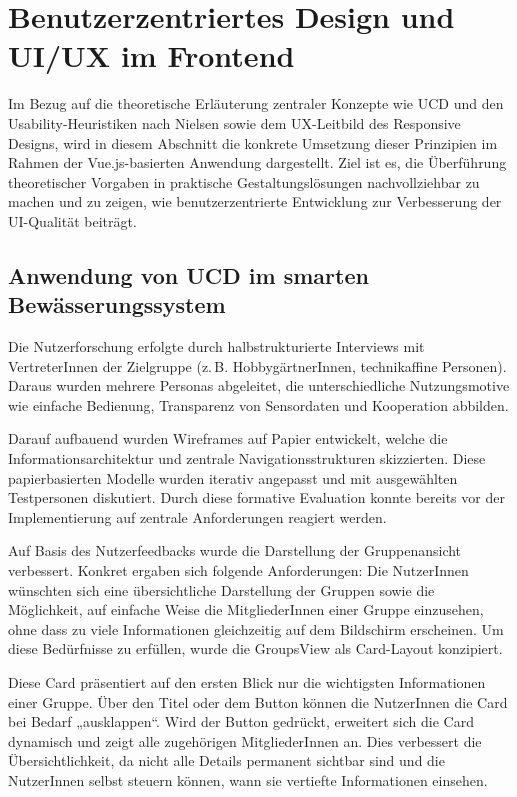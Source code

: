 \section{Benutzerzentriertes Design und UI/UX im Frontend}

Im Bezug auf die theoretische Erläuterung zentraler Konzepte wie \ac{UCD} und den Usability-Heuristiken nach Nielsen sowie dem \ac{UX}-Leitbild des Responsive Designs, wird in diesem Abschnitt die konkrete Umsetzung dieser Prinzipien im Rahmen der Vue.js-basierten Anwendung dargestellt. Ziel ist es, die Überführung theoretischer Vorgaben in praktische Gestaltungslösungen nachvollziehbar zu machen und zu zeigen, wie benutzerzentrierte Entwicklung zur Verbesserung der \ac{UI}-Qualität beiträgt.

\subsection{Anwendung von UCD im smarten Bewässerungssystem}

Die Nutzerforschung erfolgte durch halbstrukturierte Interviews mit VertreterInnen der Zielgruppe (z.\,B. HobbygärtnerInnen, technikaffine Personen). Daraus wurden mehrere Personas abgeleitet, die unterschiedliche Nutzungsmotive wie einfache Bedienung, Transparenz von Sensordaten und Kooperation abbilden. 

Darauf aufbauend wurden Wireframes auf Papier entwickelt, welche die Informationsarchitektur und zentrale Navigationsstrukturen skizzierten. Diese papierbasierten Modelle wurden iterativ angepasst und mit ausgewählten Testpersonen diskutiert. Durch diese formative Evaluation konnte bereits vor der Implementierung auf zentrale Anforderungen reagiert werden.

Auf Basis des Nutzerfeedbacks wurde die Darstellung der Gruppenansicht verbessert. Konkret ergaben sich folgende Anforderungen: Die NutzerInnen wünschten sich eine übersichtliche Darstellung der Gruppen sowie die Möglichkeit, auf einfache Weise die MitgliederInnen einer Gruppe einzusehen, ohne dass zu viele Informationen gleichzeitig auf dem Bildschirm erscheinen. Um diese Bedürfnisse zu erfüllen, wurde die GroupsView als Card-Layout konzipiert.

Diese Card präsentiert auf den ersten Blick nur die wichtigsten Informationen einer Gruppe. Über den Titel oder dem Button können die NutzerInnen die Card bei Bedarf „ausklappen“. Wird der Button gedrückt, erweitert sich die Card dynamisch und zeigt alle zugehörigen MitgliederInnen an. Dies verbessert die Übersichtlichkeit, da nicht alle Details permanent sichtbar sind und die NutzerInnen selbst steuern können, wann sie vertiefte Informationen einsehen.

